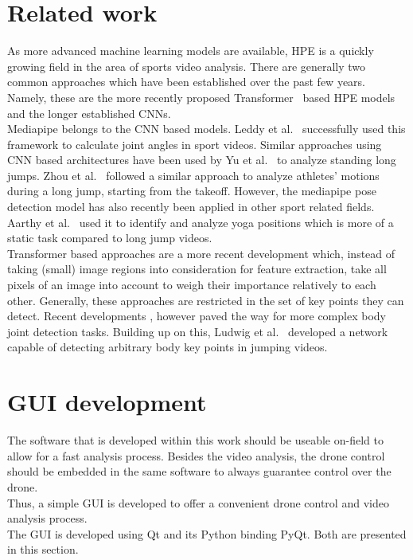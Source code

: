 \section{Related work}\label{sec:3_related_work}
As more advanced machine learning models are available, \ac{HPE} is a quickly
growing field in the area of sports video analysis.
There are generally two common approaches which have been established over the
past few years.
Namely, these are the more recently proposed
Transformer~\cite{vaswaniAttentionAllYou2017} based \ac{HPE} models and the
longer established \acp{CNN}.\\
Mediapipe\cite{mediapipe_paper} belongs to the \ac{CNN} based models.
Leddy et al.~\cite{leddyConcurrentValidityHuman2023} successfully used this
framework to calculate joint angles in sport videos.
Similar approaches using \ac{CNN} based architectures have been used by Yu
et al.~\cite{yuAnalysisGuidanceStanding2023} to analyze standing long jumps. 
Zhou et al.~\cite{zhouKinematicsParameterAnalysis2023} followed a similar
approach to analyze athletes' motions during a long jump, starting from the
takeoff.
However, the mediapipe pose detection model has also recently been applied in
other sport related fields.
Aarthy et al.~\cite{aarthyYogaPoseDetection2023} used it to identify and
analyze yoga positions which is more of a static task compared to long jump
videos.\\
Transformer based approaches are a more recent development which, instead of
taking (small) image regions into consideration for feature extraction, take
all pixels of an image into account to weigh their importance relatively
to each other.
Generally, these approaches are restricted in the set of key points they can
detect.
Recent developments \cite{ludwigRecognitionFreelySelected2022},
\cite{ludwigDetectingArbitraryKeypoints2023} however paved the way for
more complex body joint detection tasks.
Building up on this, Ludwig et al.~\cite{ludwigAllKeypointsYou2023} developed
a network capable of detecting arbitrary body key points in jumping videos.


\section{\acs*{GUI} development}
The software that is developed within this work should be useable on-field to
allow for a fast analysis process.
Besides the video analysis, the drone control should be embedded in the same 
software to always guarantee control over the drone.\\
Thus, a simple \ac{GUI} is developed to offer a convenient drone control and 
video analysis process.\\
The \ac{GUI} is developed using Qt and its Python binding PyQt.
Both are presented in this section. 

